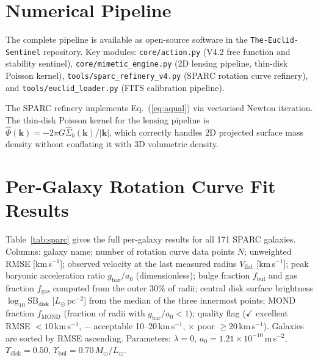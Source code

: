 \documentclass{aa}
\newcommand{\kms}{km\,s$^{-1}$}
\newcommand{\gbar}{g_\text{bar}}
\newcommand{\azero}{a_0}
\newcommand{\Upd}{\Upsilon_\text{disk}}
\newcommand{\Upb}{\Upsilon_\text{bul}}
\begin{document}
\section{Numerical Pipeline}
\label{app:pipeline}

The complete pipeline is available as open-source software in the
\texttt{The-Euclid-Sentinel} repository. Key modules:
\texttt{core/action.py} (V4.2 free function and stability sentinel),
\texttt{core/mimetic\_engine.py} (2D lensing pipeline, thin-disk Poisson
kernel), \texttt{tools/sparc\_refinery\_v4.py} (SPARC rotation curve
refinery), and \texttt{tools/euclid\_loader.py} (FITS calibration pipeline).

The SPARC refinery implements Eq.~(\ref{eq:aqual}) via vectorised Newton
iteration. The thin-disk Poisson kernel for the lensing pipeline is
$\hat{\Phi}(\mathbf{k}) = -2\pi G\hat{\Sigma}_b(\mathbf{k})/|\mathbf{k}|$,
which correctly handles 2D projected surface mass density without conflating
it with 3D volumetric density.

\section{Per-Galaxy Rotation Curve Fit Results}
\label{app:table}

Table~\ref{tab:sparc} gives the full per-galaxy results for all 171 SPARC
galaxies. Columns: galaxy name; number of rotation curve data points $N$;
unweighted RMSE [\kms]; observed velocity at the last measured radius
$V_\text{flat}$ [\kms]; peak baryonic acceleration ratio $\gbar/\azero$
(dimensionless); bulge fraction $f_\text{bul}$ and gas fraction $f_\text{gas}$
computed from the outer 30\% of radii; central disk surface brightness
$\log_{10}\mathrm{SB}_\text{disk}$ [$L_\odot\,\mathrm{pc}^{-2}$] from the
median of the three innermost points; MOND fraction $f_\text{MOND}$ (fraction
of radii with $\gbar/\azero < 1$); quality flag ($\checkmark$ excellent
RMSE $< 10$\,\kms, $-$ acceptable 10--20\,\kms, $\times$ poor
$\geq 20$\,\kms). Galaxies are sorted by RMSE ascending. Parameters:
$\lambda = 0$, $\azero = 1.21 \times 10^{-10}$\,m\,s$^{-2}$,
$\Upd = 0.50$, $\Upb = 0.70\,M_\odot/L_\odot$.

\onecolumn

\end{document}
